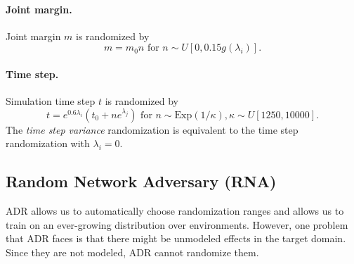 \paragraph{Joint margin.} Joint margin $m$ is randomized by
\[
m = m_0n \textrm{ for } n \sim U[0, 0.15g(\lambda_i)].
\]

\paragraph{Time step.} Simulation time step $t$ is randomized by
\[
t = e^{0.6 \lambda_i}(t_0 + ne^{\lambda_j}) \textrm{ for } n \sim \textrm{Exp}(1/\kappa), \kappa \sim U[1250, 10000].
\]
The \emph{time step variance} randomization is equivalent to the time step randomization with $\lambda_i=0$.

\subsection{Random Network Adversary (RNA)}\label{sec:random_network_adversary}
ADR allows us to automatically choose randomization ranges and allows us to train on an ever-growing distribution over environments. However, one problem that ADR faces is that there might be unmodeled effects in the target domain. Since they are not modeled, ADR cannot randomize them.

